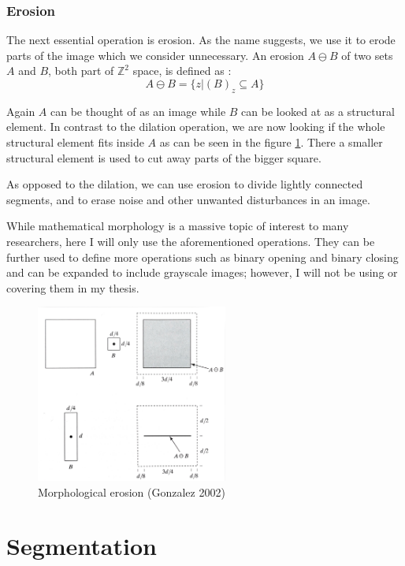 \documentclass[
  digital,     %
  oneside,     %
  nosansbold,  %
  nocolorbold, %
  lof,         %
  lot,         %
]{fithesis4}
\newcommand*{\Z}{\ensuremath{\mathbb{Z}}}
\begin{document}
\subsubsection{Erosion}

The next essential operation is erosion. As the name suggests, we use it to erode
parts of the image which we consider unnecessary. An erosion $A \ominus B$ of
two sets $A$ and $B$, both part of $\Z^2$ space, is defined as
\parencite{gonzalez2002}: 
$$A \ominus B = \{z | (B)_z \subseteq A\}$$

Again $A$ can be thought of as an image while $B$ can be looked at as a structural
element. In contrast to the dilation operation, we are now looking if the whole
structural element fits inside $A$ as can be seen in the figure
\ref{fig:morph_erosion}. There a smaller structural element is used to cut away
parts of the bigger square.

As opposed to the dilation, we can use erosion to divide lightly connected
segments, and to erase noise and other unwanted disturbances in an image.

While mathematical morphology is a massive topic of interest to many
researchers, here I will only use the aforementioned operations. They can be
further used to define more operations such as binary opening and binary closing
and can be expanded to include grayscale images; however, I will not be using or covering
them in my thesis.

\begin{figure}
    \begin{center}
        \includegraphics[width=6.3cm]{resources/morph_erosion.jpg}
    \end{center}
    \caption{Morphological erosion (Gonzalez 2002)} %
    \label{fig:morph_erosion}
\end{figure}

\section{Segmentation}
\end{document}
